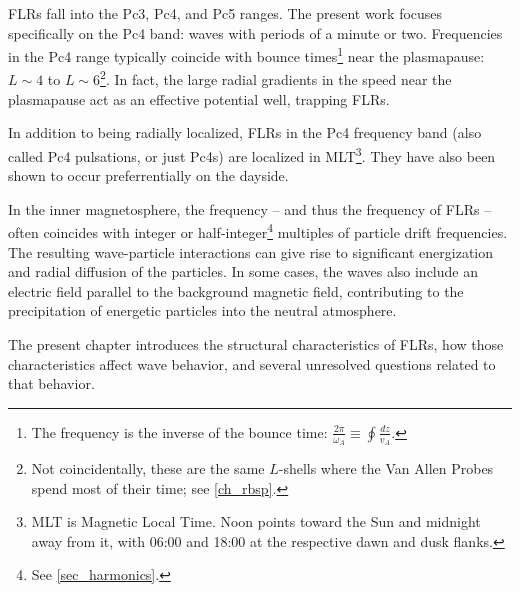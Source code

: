FLRs fall into the Pc3, Pc4, and Pc5 ranges. The present work focuses specifically on the Pc4 band: waves with periods of a minute or two. Frequencies in the Pc4 range typically coincide with \Alfven bounce times\footnote{The \Alfven frequency is the inverse of the \Alfven bounce time: $\frac{2 \pi}{\omega_A} \equiv \oint \frac{dz}{v_A}$. } near the plasmapause: $L\sim4$ to $L\sim6$\cite{anderson_1990,dai_2015,engebretson_1992,liu_2009}\footnote{Not coincidentally, these are the same $L$-shells where the Van Allen Probes spend most of their time; see \cref{ch_rbsp}. }. In fact, the large radial gradients in the \Alfven speed near the plasmapause act as an effective potential well, trapping FLRs\cite{dai_2009,klimushkin_2004,lee_1999,leonovich_2000,mager_2013,takahashi_2010}. 

In addition to being radially localized, FLRs in the Pc4 frequency band (also called Pc4 pulsations, or just Pc4s) are localized in MLT\footnote{MLT is Magnetic Local Time. Noon points toward the Sun and midnight away from it, with 06:00 and 18:00 at the respective dawn and dusk flanks. }. They have also been shown to occur preferrentially on the dayside\cite{anderson_1990,dai_2015,engebretson_1992,liu_2009,ukhorskiy_2005}. 

In the inner magnetosphere, the \Alfven frequency -- and thus the frequency of FLRs -- often coincides with integer or half-integer\footnote{See \cref{sec_harmonics}. } multiples of particle drift frequencies\cite{dai_2013}. The resulting wave-particle interactions can give rise to significant energization and radial diffusion of the particles. In some cases, the waves also include an electric field parallel to the background magnetic field, contributing to the precipitation of energetic particles into the neutral atmosphere\cite{goertz_1979,goertz_1984,thompson_1996,wygant_2002}. 

The present chapter introduces the structural characteristics of FLRs, how those characteristics affect wave behavior, and several unresolved questions related to that behavior. 



